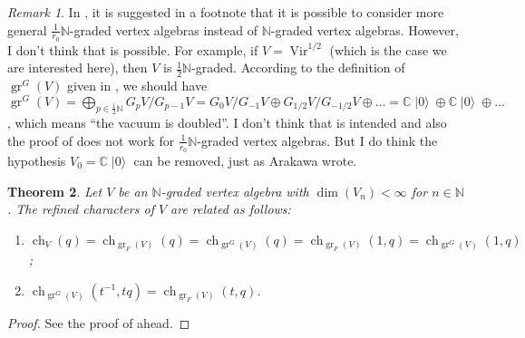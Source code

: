 \documentclass[a4paper, 12pt, reqno]{amsart}
\newtheorem{theorem}{Theorem}[section]
\theoremstyle{remark}
\newtheorem{remark}[theorem]{Remark}
\numberwithin{equation}{subsection}
\DeclareMathOperator{\Vir}{Vir}
\DeclareMathOperator{\gr}{gr}
\DeclareMathOperator{\ch}{ch}
\DeclareMathOperator{\vac}{|0\rangle}
\begin{document}
\begin{remark}
  \label{rmk:34}
  In \cite{arakawa_remark_2012}, it is suggested in a footnote that it is possible to consider more general $\tfrac{1}{r_0}\mathbb{N}$-graded vertex algebras instead of $\mathbb{N}$-graded vertex algebras.
  However, I don't think that is possible.
  For example, if $V = \Vir^{1/2}$ (which is the case we are interested here), then $V$ is $\tfrac{1}{2}\mathbb{N}$-graded.
  According to the definition of $\gr^G(V)$ given in \cite{arakawa_remark_2012}, we should have $\gr^G(V) = \bigoplus_{p \in \tfrac{1}{2}\mathbb{N}}G_pV/G_{p - 1}V = G_0V/G_{-1}V \oplus G_{1/2}V/G_{-1/2}V \oplus \dots = \mathbb{C}\vac \oplus \mathbb{C}\vac \oplus \dots$, which means ``the vacuum is doubled''.
  I don't think that is intended and also the proof of \cite[Proposition 2.6.1]{arakawa_remark_2012} does not work for $\tfrac{1}{r_0}\mathbb{N}$-graded vertex algebras.
  But I do think the hypothesis $V_0 = \mathbb{C}\vac$ can be removed, just as Arakawa wrote.
\end{remark}

\begin{theorem}
  \label{thr:45}
  Let $V$ be an $\mathbb{N}$-graded vertex algebra with $\dim(V_n) < \infty$ for $n \in \mathbb{N}$.
  The refined characters of $V$ are related as follows:
  \begin{enumerate}
  \item $\ch_V(q) = \ch_{\gr_F(V)}(q) = \ch_{\gr^G(V)}(q) = \ch_{\gr_F(V)}(1, q) = \ch_{\gr^G(V)}(1, q)$;
  \item $\ch_{\gr^G(V)}(t^{-1}, tq) = \ch_{\gr_F(V)}(t, q)$.
  \end{enumerate}
\end{theorem}

\begin{proof}
  See the proof of  ahead.
\end{proof}
\end{document}
